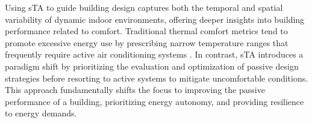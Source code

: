 \vspace{0.25cm}

Using sTA to guide building design captures both the temporal and spatial variability of dynamic indoor environments, offering deeper insights into building performance related to comfort. Traditional thermal comfort metrics tend to promote excessive energy use by prescribing narrow temperature ranges that frequently require active air conditioning systems \citep{arens_are_2010}. In contrast, sTA introduces a paradigm shift by prioritizing the evaluation and optimization of passive design strategies before resorting to active systems to mitigate uncomfortable conditions. This approach fundamentally shifts the focus to improving the passive performance of a building, prioritizing energy autonomy, and providing resilience to energy demands.


